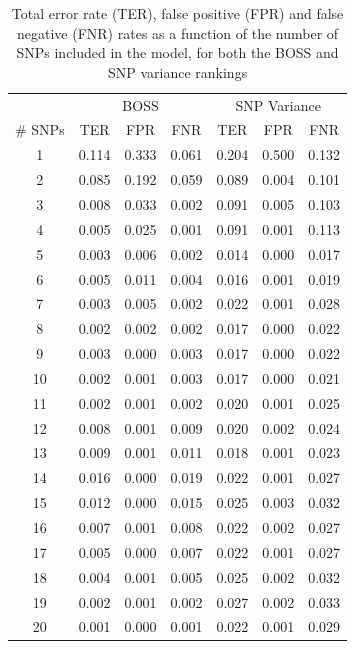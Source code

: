 \begin{table}
\centering
\caption{Total error rate (TER), false positive (FPR) and false negative
  (FNR) rates as a function of the number of SNPs included in the
  model, for both the BOSS and SNP variance rankings}
\label{tab:error}       %
\begin{tabular}{ccccccc}
\hline\noalign{\smallskip}
 & \multicolumn{3}{c}{BOSS} & \multicolumn{3}{c}{SNP Variance}\\
\noalign{\smallskip}\hline\noalign{\smallskip}
\# SNPs & TER & FPR & FNR & TER & FPR & FNR\\
\noalign{\smallskip}\hline\noalign{\smallskip}
1 & 0.114 & 0.333 & 0.061 & 0.204 & 0.500 & 0.132\\
2 & 0.085 & 0.192 & 0.059 & 0.089 & 0.004 & 0.101\\
3 & 0.008 & 0.033 & 0.002 & 0.091 & 0.005 & 0.103\\
4 & 0.005 & 0.025 & 0.001 & 0.091 & 0.001 & 0.113\\
5 & 0.003 & 0.006 & 0.002 & 0.014 & 0.000 & 0.017\\
6 & 0.005 & 0.011 & 0.004 & 0.016 & 0.001 & 0.019\\
7 & 0.003 & 0.005 & 0.002 & 0.022 & 0.001 & 0.028\\
8 & 0.002 & 0.002 & 0.002 & 0.017 & 0.000 & 0.022\\
9 & 0.003 & 0.000 & 0.003 & 0.017 & 0.000 & 0.022\\
10 & 0.002 & 0.001 &  0.003 & 0.017 & 0.000 & 0.021\\
11 & 0.002 & 0.001 &  0.002 & 0.020 & 0.001 & 0.025\\
12 & 0.008 & 0.001 &  0.009 & 0.020 & 0.002 & 0.024\\
13 & 0.009 & 0.001 &  0.011 & 0.018 & 0.001 & 0.023\\
14 & 0.016 & 0.000 &  0.019 & 0.022 & 0.001 & 0.027\\
15 & 0.012 & 0.000 &  0.015 & 0.025 & 0.003 & 0.032\\
16 & 0.007 & 0.001 &  0.008 & 0.022 & 0.002 & 0.027\\
17 & 0.005 & 0.000 &  0.007 & 0.022 & 0.001 & 0.027\\
18 & 0.004 & 0.001 &  0.005 & 0.025 & 0.002 & 0.032\\
19 & 0.002 & 0.001 &  0.002 & 0.027 & 0.002 & 0.033\\
20 & 0.001 & 0.000 &  0.001 & 0.022 & 0.001 & 0.029\\

\end{tabular}
\end{table}
